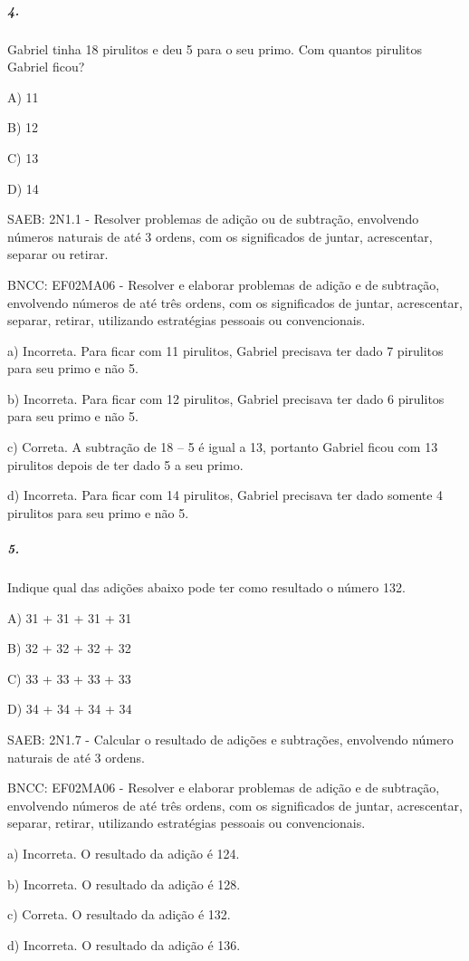 \subparagraph{4. }\label{section-118}

Gabriel tinha 18 pirulitos e deu 5 para o seu primo. Com quantos
pirulitos Gabriel ficou?

A) 11

B) 12

C) 13

D) 14

SAEB: 2N1.1 - Resolver problemas de adição ou de subtração, envolvendo
números naturais de até 3 ordens, com os significados de juntar,
acrescentar, separar ou retirar.

BNCC: EF02MA06 - Resolver e elaborar problemas de adição e de subtração,
envolvendo números de até três ordens, com os significados de juntar,
acrescentar, separar, retirar, utilizando estratégias pessoais ou
convencionais.

a) Incorreta. Para ficar com 11 pirulitos, Gabriel precisava ter dado 7
pirulitos para seu primo e não 5.

b) Incorreta. Para ficar com 12 pirulitos, Gabriel precisava ter dado 6
pirulitos para seu primo e não 5.

c) Correta. A subtração de 18 -- 5 é igual a 13, portanto Gabriel ficou
com 13 pirulitos depois de ter dado 5 a seu primo.

d) Incorreta. Para ficar com 14 pirulitos, Gabriel precisava ter dado
somente 4 pirulitos para seu primo e não 5.

\subparagraph{5. }\label{section-119}

Indique qual das adições abaixo pode ter como resultado o número 132.

A) 31 + 31 + 31 + 31

B) 32 + 32 + 32 + 32

C) 33 + 33 + 33 + 33

D) 34 + 34 + 34 + 34

SAEB: 2N1.7 - Calcular o resultado de adições e subtrações, envolvendo
número naturais de até 3 ordens.

BNCC: EF02MA06 - Resolver e elaborar problemas de adição e de subtração,
envolvendo números de até três ordens, com os significados de juntar,
acrescentar, separar, retirar, utilizando estratégias pessoais ou
convencionais.

a) Incorreta. O resultado da adição é 124.

b) Incorreta. O resultado da adição é 128.

c) Correta. O resultado da adição é 132.

d) Incorreta. O resultado da adição é 136.

